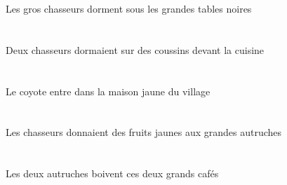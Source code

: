 \begin{exe}
Les gros chasseurs dorment sous les grandes tables noires
\ex\glll
\DEFSgObl{}   \cuisineDSgObl{}   \DEVANT{}   \INDDuAbs{}   \chasseurCDuAbs{}    \INDPlObl{}   \coussinBPlObl{}   \SUR{}  \dormirViPstCDu{}\\
\DEFSgOblP{}   \cuisineDSgOblP{}   \DEVANTP{}   \INDDuAbsP{}   \chasseurCDuAbsP{}    \INDPlOblP{}   \coussinBPlOblP{}   \SURP{}  \dormirViPstCDuP{}\\
\DEFSgOblG{}   \cuisineDSgOblG{}   \DEVANTG{}   \INDDuAbsG{}   \chasseurCDuAbsG{}    \INDPlOblG{}   \coussinBPlOblG{}   \SURG{}  \dormirViPstCDuG{}\\
Deux chasseurs dormaient sur des coussins devant la cuisine
\ex\glll
\DEFSgAbs{}   \coyoteCSgAbs{}    \DEFSgObl{}    \DEFSgObl{}   \villageCSgObl{}   \DE{}   \jauneDSg{}   \maisonDSgObl{}   \DANS{}  \entrerViPrsCSg{}\\
\DEFSgAbsP{}   \coyoteCSgAbsP{}    \DEFSgOblP{}    \DEFSgOblP{}   \villageCSgOblP{}   \DEP{}   \jauneDSgP{}   \maisonDSgOblP{}   \DANSP{}  \entrerViPrsCSgP{}\\
\DEFSgAbsG{}   \coyoteCSgAbsG{}    \DEFSgOblG{}    \DEFSgOblG{}   \villageCSgOblG{}   \DEG{}   \jauneDSgG{}   \maisonDSgOblG{}   \DANSG{}  \entrerViPrsCSgG{}\\
Le coyote entre dans la maison jaune du village
\ex\glll
\DEFPlErg{}   \chasseurCPlErg{}    \DEFPlDat{}   \grandBPl{}   \autrucheBPlDat{}   \INDPlAbs{}   \jauneAPl{}   \fruitAPlAbs{}  \donnerVdPstAPl{}\\
\DEFPlErgP{}   \chasseurCPlErgP{}    \DEFPlDatP{}   \grandBPlP{}   \autrucheBPlDatP{}   \INDPlAbsP{}   \jauneAPlP{}   \fruitAPlAbsP{}  \donnerVdPstAPlP{}\\
\DEFPlErgG{}   \chasseurCPlErgG{}    \DEFPlDatG{}   \grandBPlG{}   \autrucheBPlDatG{}   \INDPlAbsG{}   \jauneAPlG{}   \fruitAPlAbsG{}  \donnerVdPstAPlG{}\\
Les chasseurs donnaient des fruits jaunes aux grandes autruches
\ex\glll
\DEFDuErg{}   \autrucheBDuErg{}   \DEMDuAbs{}   \grandCDu{}   \cafeCDuAbs{}  \boireVtPrsCDu{}\\
\DEFDuErgP{}   \autrucheBDuErgP{}   \DEMDuAbsP{}   \grandCDuP{}   \cafeCDuAbsP{}  \boireVtPrsCDuP{}\\
\DEFDuErgG{}   \autrucheBDuErgG{}   \DEMDuAbsG{}   \grandCDuG{}   \cafeCDuAbsG{}  \boireVtPrsCDuG{}\\
Les deux autruches boivent ces deux grands cafés
\ex\glll
\INDDuErg{}   \autrucheBDuErg{}    \DEMPlDat{}   \maigreCPl{}   \coyoteCPlDat{}   \INDSgAbs{}   \oeufCSgAbs{}  \donnerVdPrsCSg{}\\

\end{exe}
